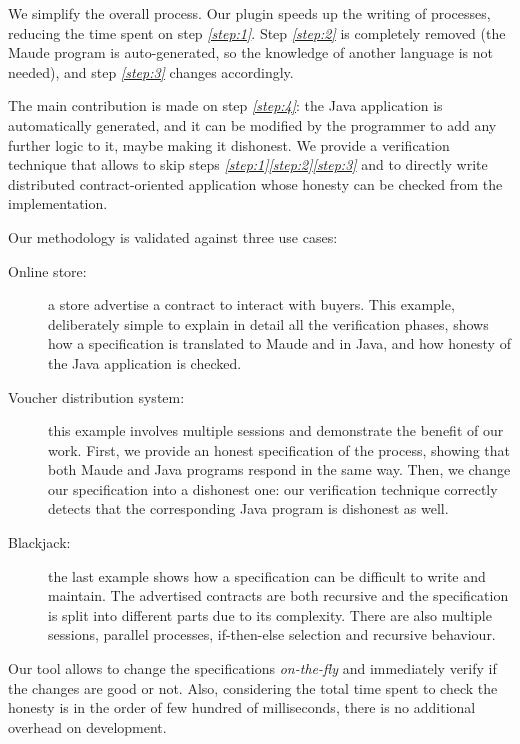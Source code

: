 We simplify the overall process. %
Our plugin speeds up the writing of \coco processes, 
reducing the time spent on step \textit{\ref{step:1}}. 
Step \textit{\ref{step:2}} is completely removed (the Maude program is auto-generated, so the knowledge of another language is not needed), 
and step \textit{\ref{step:3}} changes accordingly. %

The main contribution is made on step \textit{\ref{step:4}}: the Java application is automatically generated, 
and it can be modified by the programmer to add any further logic to it, 
maybe making it dishonest. 
We provide a verification technique that allows to skip steps \textit{\ref{step:1}}\textit{\ref{step:2}}\textit{\ref{step:3}} and to directly write distributed contract-oriented application whose
honesty can be checked from the implementation.

Our methodology is validated against three use cases:
\begin{description}

\item[Online store:] 
  a store advertise a contract to interact with buyers. 
  This example, deliberately simple to explain in detail 
  all the verification phases, 
  shows how a \coco specification is translated to Maude and in Java, 
  and how honesty of the Java application is checked.
  
\item[Voucher distribution system:] this example involves multiple sessions 
  and demonstrate the benefit of our work. 
  First, we provide an honest specification of the process, 
  showing that both Maude and Java programs respond in the same way. 
  Then, we change our specification into a dishonest one:
  our verification technique correctly detects that 
  the corresponding Java program is dishonest as well.
	
\item[Blackjack:] the last example shows how a specification can be difficult to write and maintain. The advertised contracts are both recursive and the specification is split into different parts due to its complexity. There are also multiple sessions, parallel processes, if-then-else selection and recursive behaviour.
\end{description}

Our tool allows to change the specifications \emph{on-the-fly} and immediately verify if the changes are good or not. 
Also, considering the total time spent to check the honesty is in the order of few hundred of milliseconds, there is no additional overhead on development.

